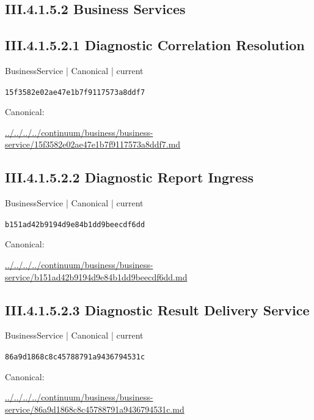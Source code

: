 \documentclass[10pt,a4paper]{article}
\begin{document}
\subsection*{III.4.1.5.2 Business Services}
\subsection*{III.4.1.5.2.1 Diagnostic Correlation Resolution}
\label{element-15f3582e02ae47e1b7f9117573a8ddf7}
{\small BusinessService | Canonical | current}\par
\texttt{15f3582e02ae47e1b7f9117573a8ddf7}\par
Canonical: \par
{\footnotesize\url{../../../../continuum/business/business-service/15f3582e02ae47e1b7f9117573a8ddf7.md}}\par
\subsection*{III.4.1.5.2.2 Diagnostic Report Ingress}
\label{element-b151ad42b9194d9e84b1dd9beecdf6dd}
{\small BusinessService | Canonical | current}\par
\texttt{b151ad42b9194d9e84b1dd9beecdf6dd}\par
Canonical: \par
{\footnotesize\url{../../../../continuum/business/business-service/b151ad42b9194d9e84b1dd9beecdf6dd.md}}\par
\subsection*{III.4.1.5.2.3 Diagnostic Result Delivery Service}
\label{element-86a9d1868c8c45788791a9436794531c}
{\small BusinessService | Canonical | current}\par
\texttt{86a9d1868c8c45788791a9436794531c}\par
Canonical: \par
{\footnotesize\url{../../../../continuum/business/business-service/86a9d1868c8c45788791a9436794531c.md}}\par
\end{document}
